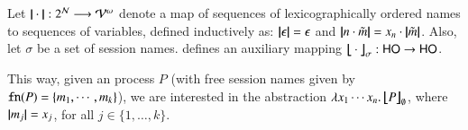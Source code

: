 \documentclass[runningheads]{llncs}
\begin{document}
{%

%

%




\begin{definition} \label{d:trabs}\label{d:auxmap}
	Let $|\!|\cdot|\!|: 2^{\mathcal{N}} \longrightarrow \mathcal{V}^\omega$
	denote a map of sequences of lexicographically ordered names to sequences of variables, defined
	inductively 
	as: 
	$|\!|\epsilon|\!| = \epsilon$ and $|\!|n \cdot \tilde{m}|\!| = x_n \cdot |\!|\tilde{m}|\!|$. 
	Also, let $\sigma$ be a set of session names.
	 defines an auxiliary mapping
	$\big\lfloor\!\!\big\lfloor\cdot\big\rfloor\!\!\big\rfloor^{}_\sigma: \mathsf{HO} \to \mathsf{HO}$.
\end{definition}

%

\noi This way, given an \HO
 process $P$ (with free session names given by $\mathtt{fn}(P) = \{m_1, \cdots, m_k\}$),
 we are interested in the abstraction
$\lambda x_1\cdots x_n.\,\big\lfloor\!\!\big\lfloor P\big\rfloor\!\!\big\rfloor^{}_\emptyset$, where $|\!|m_j|\!| = x_j$, for all $j \in \{1, \ldots, k\}$. 





}
\end{document}
